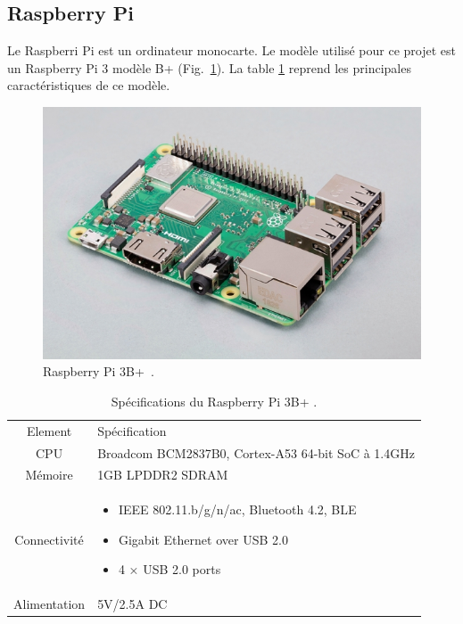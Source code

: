 \subsection*{Raspberry Pi}

Le Raspberri Pi est un ordinateur monocarte. Le modèle utilisé pour ce projet est un Raspberry Pi 3 modèle B+ (Fig.~\ref{fig:state-raspberrypi}). La table \ref{tb:state-raspberrypi-spec} reprend les principales caractéristiques de ce modèle.

\begin{figure}[H]
    \centering
    \includegraphics[scale=0.4]{res/pictures/raspberrypi3b+.png}
    \caption{Raspberry Pi 3B+~\cite{raspberry:shop}.}
    \label{fig:state-raspberrypi}
\end{figure}

\begin{table}[H]
    \centering
    \begin{tabular}{|c|p{}|}
        \hline
        \rowcolor{lightgray}
        Element            & Spécification\\
        CPU & Broadcom BCM2837B0, Cortex-A53 64-bit SoC à 1.4GHz\\ \hline
        Mémoire & 1GB LPDDR2 SDRAM \\ \hline
        Connectivité & 
        \begin{itemize}
            \item IEEE 802.11.b/g/n/ac, Bluetooth 4.2, BLE
            \item Gigabit Ethernet over USB 2.0
            \item 4 × USB 2.0 ports
        \end{itemize}\\ \hline
        Alimentation & 5V/2.5A DC\\ \hline
    \end{tabular}
    \caption{Spécifications du Raspberry Pi 3B+ \cite{raspberry:shop}.}
    \label{tb:state-raspberrypi-spec}
\end{table}
